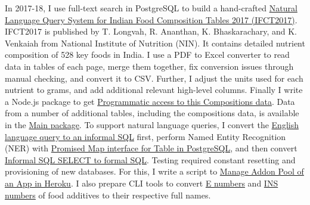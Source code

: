 \vspace{-3ex}
In 2017-18, I use full-text search in PostgreSQL to build a hand-crafted \href{https://ifct2017.github.io}{Natural Language Query System for Indian Food Composition Tables 2017 (IFCT2017)}. IFCT2017 is published by T. Longvah, R. Ananthan, K. Bhaskarachary, and K. Venkaiah from National Institute of Nutrition (NIN). It contains detailed nutrient composition of 528 key foods in India. I use a PDF to Excel converter to read data in tables of each page, merge them together, fix conversion issues through manual checking, and convert it to CSV. Further, I adjust the units used for each nutrient to grams, and add additional relevant high-level columns. Finally I write a Node.js package to get \href{https://github.com/ifct2017/compositions}{Programmatic access to this Compositions data}. Data from a number of additional tables, including the compositions data, is available in the \href{https://github.com/ifct2017/ifct2017}{Main package}. To support natural language queries, I convert the \href{https://github.com/nodef/pg-english}{English language query to an informal SQL} first, perform Named Entity Recognition (NER) with \href{https://github.com/nodef/map-pg}{Promised Map interface for Table in PostgreSQL}, and then convert \href{https://github.com/nodef/pg-slang}{Informal SQL SELECT to formal SQL}. Testing required constant resetting and provisioning of new databases. For this, I write a script to \href{https://github.com/nodef/heroku-addonpool}{Manage Addon Pool of an App in Heroku}. I also prepare CLI tools to convert \href{https://github.com/nodef/food-e}{E numbers} and \href{https://github.com/nodef/food-ins}{INS numbers} of food additives to their respective full names.

